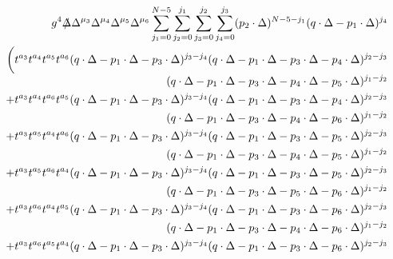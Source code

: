 \documentclass[12pt]{article}
\def\Slash#1{\rlap{\hbox{$\mskip 3 mu /$}}#1}      %
\begin{document}
\begin{eqnarray}
    \label{eq:omeqqgggg}
    &&
    g^4 
    \Slash{\Delta} \Delta^{\mu_3} \Delta^{\mu_4} \Delta^{\mu_5} \Delta^{\mu_6} 
    \sum\limits_{j_1=0}^{N-5}
    \sum\limits_{j_2=0}^{j_1}
    \sum\limits_{j_3=0}^{j_2}
    \sum\limits_{j_4=0}^{j_3}
    (p_2\cdot \Delta)^{N-5-j_1} (q\cdot \Delta-p_1\cdot \Delta)^{j_4} 
    \nonumber
    \\
    &&
    \biggl( t^{a_3} t^{a_4} t^{a_5} t^{a_6} 
    (q\cdot \Delta-p_1\cdot \Delta-p_3\cdot \Delta)^{j_3-j_4} (q\cdot \Delta-p_1\cdot \Delta-p_3\cdot \Delta-p_4\cdot \Delta)^{j_2-j_3} 
    \nonumber
    \\[-1mm]
    &&\qquad (q\cdot \Delta-p_1\cdot \Delta-p_3\cdot \Delta-p_4\cdot \Delta-p_5\cdot \Delta)^{j_1-j_2}
    \nonumber
    \\
    &&
+ t^{a_3} t^{a_4} t^{a_6} t^{a_5} 
    (q\cdot \Delta-p_1\cdot \Delta-p_3\cdot \Delta)^{j_3-j_4} (q\cdot \Delta-p_1\cdot \Delta-p_3\cdot \Delta-p_4\cdot \Delta)^{j_2-j_3} 
    \nonumber
    \\
    &&\qquad (q\cdot \Delta-p_1\cdot \Delta-p_3\cdot \Delta-p_4\cdot \Delta-p_6\cdot \Delta)^{j_1-j_2}
    \nonumber
    \\
    &&
+ t^{a_3} t^{a_5} t^{a_4} t^{a_6} 
    (q\cdot \Delta-p_1\cdot \Delta-p_3\cdot \Delta)^{j_3-j_4} (q\cdot \Delta-p_1\cdot \Delta-p_3\cdot \Delta-p_5\cdot \Delta)^{j_2-j_3} 
    \nonumber
    \\
    &&\qquad (q\cdot \Delta-p_1\cdot \Delta-p_3\cdot \Delta-p_4\cdot \Delta-p_5\cdot \Delta)^{j_1-j_2}
    \nonumber
    \\
    &&
+ t^{a_3} t^{a_5} t^{a_6} t^{a_4} 
    (q\cdot \Delta-p_1\cdot \Delta-p_3\cdot \Delta)^{j_3-j_4} (q\cdot \Delta-p_1\cdot \Delta-p_3\cdot \Delta-p_5\cdot \Delta)^{j_2-j_3} 
    \nonumber
    \\
    &&\qquad (q\cdot \Delta-p_1\cdot \Delta-p_3\cdot \Delta-p_5\cdot \Delta-p_6\cdot \Delta)^{j_1-j_2}
    \nonumber
    \\
    &&
+ t^{a_3} t^{a_6} t^{a_4} t^{a_5} 
    (q\cdot \Delta-p_1\cdot \Delta-p_3\cdot \Delta)^{j_3-j_4} (q\cdot \Delta-p_1\cdot \Delta-p_3\cdot \Delta-p_6\cdot \Delta)^{j_2-j_3} 
    \nonumber
    \\
    &&\qquad (q\cdot \Delta-p_1\cdot \Delta-p_3\cdot \Delta-p_4\cdot \Delta-p_6\cdot \Delta)^{j_1-j_2}
    \nonumber
    \\
    &&
+ t^{a_3} t^{a_6} t^{a_5} t^{a_4} 
    (q\cdot \Delta-p_1\cdot \Delta-p_3\cdot \Delta)^{j_3-j_4} (q\cdot \Delta-p_1\cdot \Delta-p_3\cdot \Delta-p_6\cdot \Delta)^{j_2-j_3} 

\end{eqnarray}
\end{document}
